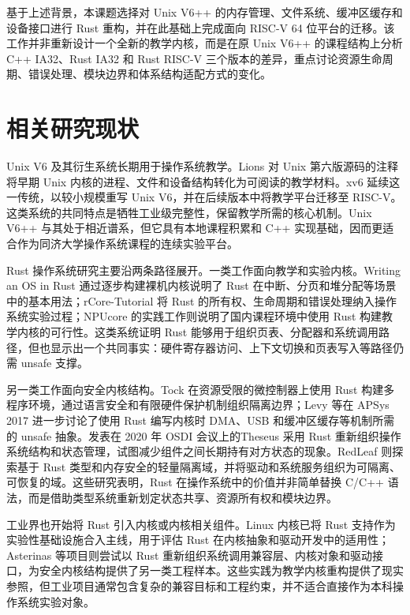 基于上述背景，本课题选择对 Unix V6++ 的内存管理、文件系统、缓冲区缓存和设备接口进行 Rust 重构，并在此基础上完成面向 RISC-V 64 位平台的迁移。该工作并非重新设计一个全新的教学内核，而是在原 Unix V6++ 的课程结构上分析 C++ IA32、Rust IA32 和 Rust RISC-V 三个版本的差异，重点讨论资源生命周期、错误处理、模块边界和体系结构适配方式的变化。

\section{相关研究现状}

Unix V6 及其衍生系统长期用于操作系统教学。Lions 对 Unix 第六版源码的注释将早期 Unix 内核的进程、文件和设备结构转化为可阅读的教学材料\cite{lions1996unix}。xv6 延续这一传统，以较小规模重写 Unix V6，并在后续版本中将教学平台迁移至 RISC-V\cite{kaashoek2021xv6}。这类系统的共同特点是牺牲工业级完整性，保留教学所需的核心机制。Unix V6++ 与其处于相近谱系，但它具有本地课程积累和 C++ 实现基础，因而更适合作为同济大学操作系统课程的连续实验平台。

Rust 操作系统研究主要沿两条路径展开。一类工作面向教学和实验内核。Writing an OS in Rust 通过逐步构建裸机内核说明了 Rust 在中断、分页和堆分配等场景中的基本用法\cite{oppermannWritingOS}；rCore-Tutorial 将 Rust 的所有权、生命周期和错误处理纳入操作系统实验过程\cite{rcoreTutorialBook}；NPUcore 的实践工作则说明了国内课程环境中使用 Rust 构建教学内核的可行性\cite{zhang2025npucore}。这类系统证明 Rust 能够用于组织页表、分配器和系统调用路径，但也显示出一个共同事实：硬件寄存器访问、上下文切换和页表写入等路径仍需 unsafe 支撑。

另一类工作面向安全内核结构。Tock 在资源受限的微控制器上使用 Rust 构建多程序环境，通过语言安全和有限硬件保护机制组织隔离边界\cite{levy2017tock}；Levy 等在 APSys 2017 进一步讨论了使用 Rust 编写内核时 DMA、USB 和缓冲区缓存等机制所需的 unsafe 抽象\cite{levy2017kernelrust}。发表在 2020 年 OSDI 会议上的Theseus 采用 Rust 重新组织操作系统结构和状态管理，试图减少组件之间长期持有对方状态的现象\cite{boos2020theseus}。RedLeaf 则探索基于 Rust 类型和内存安全的轻量隔离域，并将驱动和系统服务组织为可隔离、可恢复的域\cite{narayanan2020redleaf}。这些研究表明，Rust 在操作系统中的价值并非简单替换 C/C++ 语法，而是借助类型系统重新划定状态共享、资源所有权和模块边界。

工业界也开始将 Rust 引入内核或内核相关组件。Linux 内核已将 Rust 支持作为实验性基础设施合入主线，用于评估 Rust 在内核抽象和驱动开发中的适用性\cite{linuxkernelRust}；Asterinas 等项目则尝试以 Rust 重新组织系统调用兼容层、内核对象和驱动接口，为安全内核结构提供了另一类工程样本\cite{asterinasBook}。这些实践为教学内核重构提供了现实参照，但工业项目通常包含复杂的兼容目标和工程约束，并不适合直接作为本科操作系统实验对象。

